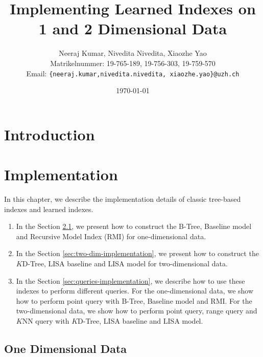 \documentclass[a4paper,12pt]{scrreprt}
\title{Implementing Learned Indexes on 1 and 2 Dimensional Data}
\author{
  Neeraj Kumar, Nivedita Nivedita, Xiaozhe Yao\\[-5pt]
  \scriptsize Matrikelnummer: 19-765-189, 19-756-303, 19-759-570\\[-5pt]
  \scriptsize Email: \texttt{\{neeraj.kumar,nivedita.nivedita, xiaozhe.yao\}@uzh.ch}
}
\date{\vspace*{2cm}\today}
\newenvironment{mscsummary}{\fbox{Summary}}{\medskip}
\begin{document}
\begingroup
\let\newpage\relax%
\maketitle
\newpage\null\thispagestyle{blank}\newpage
\setcounter{page}{0}
\endgroup

\begin{abstract}

\end{abstract}

\setcounter{tocdepth}{2}
\tableofcontents 

\chapter{Introduction}



\chapter{Implementation}

\begin{mscsummary}
	In this chapter, we describe the implementation details of classic tree-based indexes and learned indexes.
	\begin{enumerate}
		\item In the Section \ref{sec:one-dim-implementation}, we present how to construct the B-Tree, Baseline model and Recursive Model Index (RMI) for one-dimensional data.
		\item In the Section \ref{sec:two-dim-implementation}, we present how to construct the $K$D-Tree, LISA baseline and LISA model for two-dimensional data.
		\item In the Section \ref{sec:queries-implementation}, we describe how to use these indexes to perform different queries. For the one-dimensional data, we show how to perform point query with B-Tree, Baseline model and RMI. For the two-dimensional data, we show how to perform point query, range query and $K$NN query with $K$D-Tree, LISA baseline and LISA model.
	\end{enumerate}
\end{mscsummary}

\section{One Dimensional Data}
\label{sec:one-dim-implementation}

\end{document}
